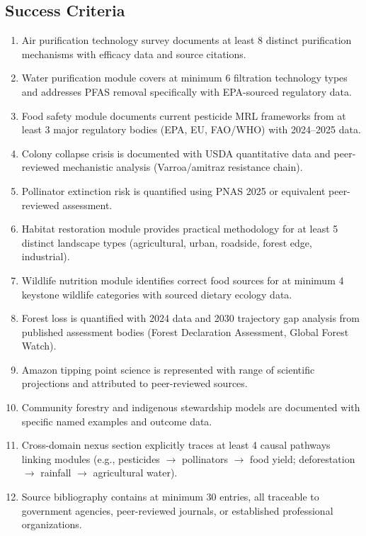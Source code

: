\documentclass[11pt,letterpaper]{article}
\begin{document}
\subsection{Success Criteria}

\begin{enumerate}[leftmargin=*, label=\textbf{SC-\arabic*.}]
  \item Air purification technology survey documents at least 8 distinct purification mechanisms with efficacy data and source citations.
  \item Water purification module covers at minimum 6 filtration technology types and addresses PFAS removal specifically with EPA-sourced regulatory data.
  \item Food safety module documents current pesticide MRL frameworks from at least 3 major regulatory bodies (EPA, EU, FAO/WHO) with 2024--2025 data.
  \item Colony collapse crisis is documented with USDA quantitative data and peer-reviewed mechanistic analysis (Varroa/amitraz resistance chain).
  \item Pollinator extinction risk is quantified using PNAS 2025 or equivalent peer-reviewed assessment.
  \item Habitat restoration module provides practical methodology for at least 5 distinct landscape types (agricultural, urban, roadside, forest edge, industrial).
  \item Wildlife nutrition module identifies correct food sources for at minimum 4 keystone wildlife categories with sourced dietary ecology data.
  \item Forest loss is quantified with 2024 data and 2030 trajectory gap analysis from published assessment bodies (Forest Declaration Assessment, Global Forest Watch).
  \item Amazon tipping point science is represented with range of scientific projections and attributed to peer-reviewed sources.
  \item Community forestry and indigenous stewardship models are documented with specific named examples and outcome data.
  \item Cross-domain nexus section explicitly traces at least 4 causal pathways linking modules (e.g., pesticides $\rightarrow$ pollinators $\rightarrow$ food yield; deforestation $\rightarrow$ rainfall $\rightarrow$ agricultural water).
  \item Source bibliography contains at minimum 30 entries, all traceable to government agencies, peer-reviewed journals, or established professional organizations.
\end{enumerate}
\end{document}
